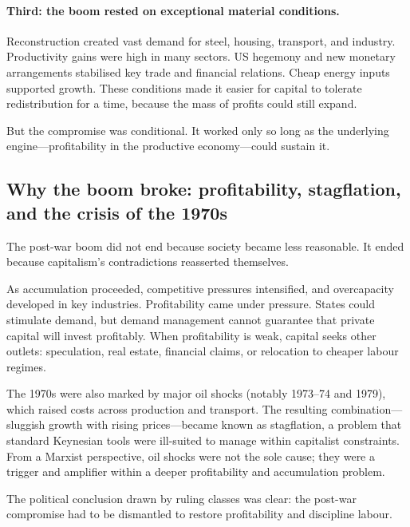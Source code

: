 \paragraph{Third: the boom rested on exceptional material conditions.}
Reconstruction created vast demand for steel, housing, transport, and industry. Productivity gains were high in
many sectors. US hegemony and new monetary arrangements stabilised key trade and financial relations. Cheap energy
inputs supported growth. These conditions made it easier for capital to tolerate redistribution for a time,
because the mass of profits could still expand.

But the compromise was conditional. It worked only so long as the underlying engine—profitability in the productive
economy—could sustain it.

\subsection{Why the boom broke: profitability, stagflation, and the crisis of the 1970s}
\label{subsec:1970s-crisis}

The post-war boom did not end because society became less reasonable. It ended because capitalism's contradictions
reasserted themselves.

As accumulation proceeded, competitive pressures intensified, and overcapacity developed in key industries.
Profitability came under pressure. States could stimulate demand, but demand management cannot guarantee that
private capital will invest profitably. When profitability is weak, capital seeks other outlets: speculation,
real estate, financial claims, or relocation to cheaper labour regimes.

The 1970s were also marked by major oil shocks (notably 1973--74 and 1979), which raised costs across production
and transport. The resulting combination—sluggish growth with rising prices—became known as stagflation, a problem
that standard Keynesian tools were ill-suited to manage within capitalist constraints. From a Marxist perspective,
oil shocks were not the sole cause; they were a trigger and amplifier within a deeper profitability and accumulation
problem.

The political conclusion drawn by ruling classes was clear: the post-war compromise had to be dismantled to restore
profitability and discipline labour.

